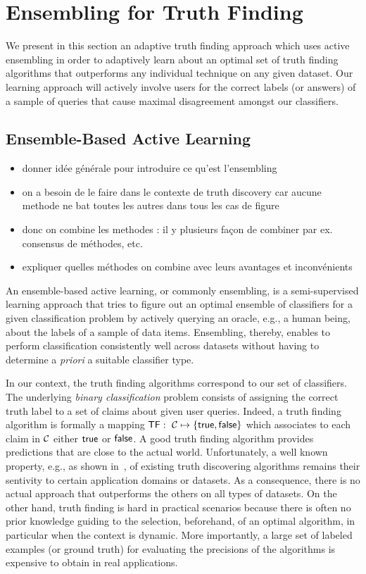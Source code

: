 \section{Ensembling for Truth Finding}\label{ensembling}
We present in this section an adaptive truth finding approach which uses active ensembling in order to 
adaptively learn about an optimal set of truth finding algorithms that outperforms any individual
technique on any given dataset. Our learning approach will actively involve users for the correct
labels (or answers) of a sample of queries that cause maximal disagreement amongst our classifiers.

\subsection{Ensemble-Based Active Learning}
\begin{itemize}
\item donner idée générale pour introduire  ce qu'est l'ensembling
\item on a besoin de le faire dans le contexte de truth discovery car aucune methode ne bat toutes les autres dans tous les cas de figure
\item donc on combine les methodes : il y plusieurs façon de combiner par ex. consensus de méthodes, etc.
\item expliquer quelles méthodes on combine avec leurs avantages et inconvénients
\end{itemize}

\medskip
An ensemble-based active learning, or commonly ensembling, is a semi-supervised learning approach that tries
to figure out an optimal ensemble of classifiers for a given classification problem by actively querying an 
oracle, e.g., a human being, about the labels of a sample of data items. Ensembling, thereby, enables to perform
classification consistently well across datasets without having to determine a \emph{priori} a suitable classifier 
type.

In our context, the truth finding algorithms correspond to our set of classifiers. The underlying \emph{binary classification} 
problem consists of assigning the correct truth label to a set of claims about given user queries. Indeed, a truth finding 
algorithm is formally a mapping $\textsf{TF}:~\mathcal{C} \mapsto \{\mathsf{true}, \mathsf{false}\}$ which associates to each claim in $\mathcal{C}$
either $\mathsf{true}$ or $\mathsf{false}$. A good truth finding algorithm provides  predictions that are close to the actual world. Unfortunately, 
a well known property, e.g., as shown in~\cite{Li12, Wagui14}, of existing truth discovering algorithms remains their sentivity
to certain application domains or datasets. As a consequence, there is no actual approach that outperforms the others on all types 
of datasets. On the other hand, truth finding is hard in practical scenarios because there is often no prior knowledge guiding to
the selection, beforehand, of an optimal algorithm, in particular when the context is dynamic. More importantly, a large set of labeled 
examples (or ground truth) for evaluating the precisions of the algorithms is expensive to obtain in real applications. 

